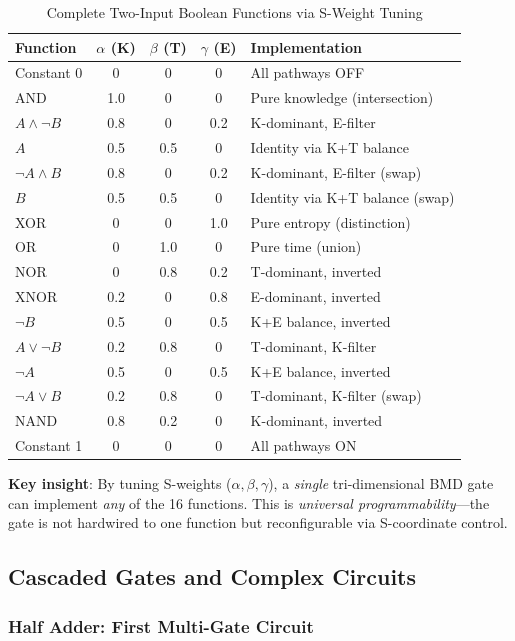 \documentclass[11pt,a4paper]{article}
\begin{document}
\begin{table}[H]
\centering
\caption{Complete Two-Input Boolean Functions via S-Weight Tuning}
\small
\begin{tabular}{lcccp{4cm}}
\toprule
\textbf{Function} & \textbf{$\alpha$ (K)} & \textbf{$\beta$ (T)} & \textbf{$\gamma$ (E)} & \textbf{Implementation} \\
\midrule
Constant 0 & 0 & 0 & 0 & All pathways OFF \\
AND & 1.0 & 0 & 0 & Pure knowledge (intersection) \\
$A \land \neg B$ & 0.8 & 0 & 0.2 & K-dominant, E-filter \\
$A$ & 0.5 & 0.5 & 0 & Identity via K+T balance \\
$\neg A \land B$ & 0.8 & 0 & 0.2 & K-dominant, E-filter (swap) \\
$B$ & 0.5 & 0.5 & 0 & Identity via K+T balance (swap) \\
XOR & 0 & 0 & 1.0 & Pure entropy (distinction) \\
OR & 0 & 1.0 & 0 & Pure time (union) \\
NOR & 0 & 0.8 & 0.2 & T-dominant, inverted \\
XNOR & 0.2 & 0 & 0.8 & E-dominant, inverted \\
$\neg B$ & 0.5 & 0 & 0.5 & K+E balance, inverted \\
$A \lor \neg B$ & 0.2 & 0.8 & 0 & T-dominant, K-filter \\
$\neg A$ & 0.5 & 0 & 0.5 & K+E balance, inverted \\
$\neg A \lor B$ & 0.2 & 0.8 & 0 & T-dominant, K-filter (swap) \\
NAND & 0.8 & 0.2 & 0 & K-dominant, inverted \\
Constant 1 & 0 & 0 & 0 & All pathways ON \\
\bottomrule
\end{tabular}
\end{table}

\textbf{Key insight}: By tuning S-weights ($\alpha, \beta, \gamma$), a \textit{single} tri-dimensional BMD gate can implement \textit{any} of the 16 functions. This is \textit{universal programmability}—the gate is not hardwired to one function but reconfigurable via S-coordinate control.

\subsection{Cascaded Gates and Complex Circuits}

\subsubsection{Half Adder: First Multi-Gate Circuit}
\end{document}
